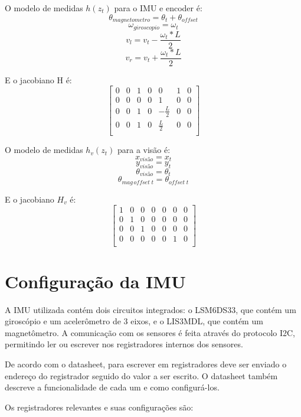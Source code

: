 \documentclass[
	12pt,				%
	openright,			%
	twoside,			%
	convert,
	a4paper,			%
	english,			%
	french,				%
	spanish,			%
	brazil				%
	]{abntex2}
\begin{document}
\par
O modelo de medidas $h(z_t)$ para o IMU e encoder é:
\begin{equation}
	\theta_{magnetometro} = \theta_t + \theta_{offset}
\end{equation}
\begin{equation}
	\omega_{giroscopio} = \omega_t
\end{equation}
\begin{equation}
	v_l = v_t - \frac{\omega_t * L}{2}
\end{equation}
\begin{equation}
	v_r = v_t + \frac{\omega_t * L}{2}
\end{equation}
\par
E o jacobiano H é:
\[
\begin{bmatrix}
	0 & 0 & 1 & 0 & 0 & 1 & 0\\
	0 & 0 & 0 & 0 & 1  & 0 & 0\\
	0 & 0 & 1 & 0 & -\frac{L}{2} & 0 & 0\\
	0 & 0 & 1 & 0 & \frac{L}{2} & 0 & 0\\
\end{bmatrix}
\]
\par
O modelo de medidas $h_v(z_t)$ para a visão é:
\begin{equation}
	x_{visão} = x_t
\end{equation}
\begin{equation}
	y_{visão} = y_t
\end{equation}
\begin{equation}
	\theta_{visão} = \theta_t
\end{equation}
\begin{equation}
	\theta_{mag \, offset \; t} = \theta_{offset \; t}
\end{equation}
\par
E o jacobiano $H_v$ é:
\[
\begin{bmatrix}
	1 & 0 & 0 & 0 & 0 & 0 & 0\\
	0 & 1 & 0 & 0 & 0 & 0 & 0\\
	0 & 0 & 1 & 0 & 0 & 0 & 0\\
	0 & 0 & 0 & 0 & 0 & 1 & 0\\
\end{bmatrix}
\]
\section{Configuração da IMU}

A IMU utilizada \cite{minimu} contém dois circuitos integrados: o LSM6DS33, que contém um giroscópio e um acelerômetro de 3 eixos, e o LIS3MDL, que contém um magnetômetro. A comunicação com os sensores é feita através do protocolo I2C, permitindo ler ou escrever nos registradores internos dos sensores.
\par
De acordo com o datasheet, para escrever em registradores deve ser enviado o endereço do registrador seguido do valor a ser escrito. O datasheet também descreve a funcionalidade de cada um e como configurá-los.
\par
Os registradores relevantes e suas configurações são:
\end{document}
